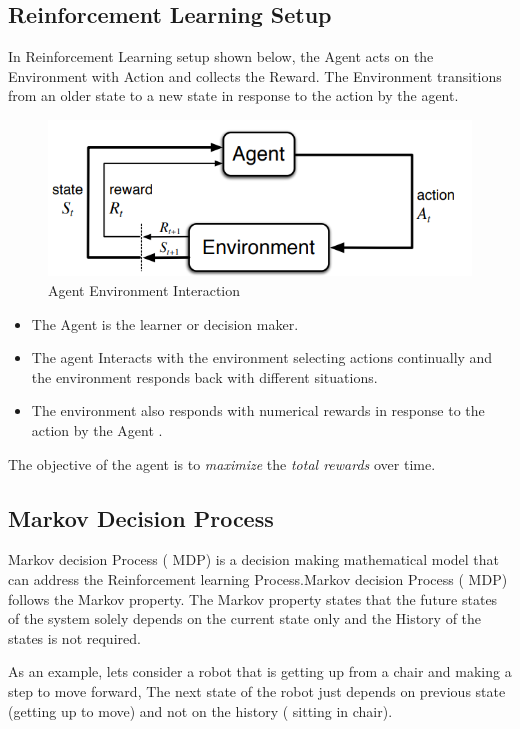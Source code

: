 \documentclass[a4paper,12pt]{Classes/RoboticsLaTeX}
\begin{document}
     \subsection{Reinforcement Learning Setup}

     In Reinforcement Learning setup shown below, the Agent acts on the Environment with Action and collects the Reward. The Environment transitions from an older state to a new state in response to the action by the agent.

     \begin{figure}[H]
         \centering
         \includegraphics[width=0.75\linewidth]{Figures/Agent_Enviornment_Interaction.png}
         \caption{Agent Environment Interaction}
         \label{fig:enter-label}
     \end{figure}

    \begin{itemize}
        \item The Agent is the learner or decision maker.
        \item The agent Interacts with the environment selecting actions continually and the environment  responds back with different situations.
        \item The environment also  responds with  numerical  rewards in response to the action by the Agent .
    \end{itemize}
    
    The objective of the agent is to \textit{maximize} the \textit{total rewards} over time.
     
     \subsection{Markov Decision Process}
     Markov decision Process ( MDP) is a decision making mathematical model  that can address the Reinforcement learning Process.Markov decision Process ( MDP) follows the Markov property. The Markov property states that the future states of the system solely depends on the current state only and the History of the states is not required.
     
     As an example, lets consider a robot that is getting up from a chair and  making a step to move forward, The next state of the robot just depends on previous state (getting up to move) and not on the history ( sitting in chair). \cite{builtinUnderstandingMarkov}
     
\end{document}
